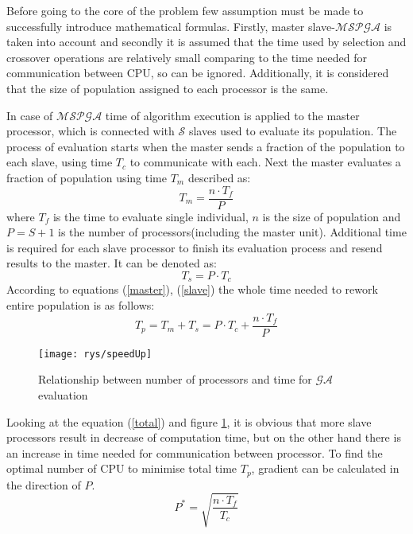 Before going to the core of the problem few assumption must be made to
successfully introduce mathematical formulas. Firstly, master
slave-$\mathcal{MSPGA}$ is taken into account and secondly it is assumed that the time used
by selection and crossover operations are relatively small comparing to the time
needed for communication between CPU, so can be ignored. Additionally, it is
considered that the size of population assigned to each processor is the same. 

In case of $\mathcal{MSPGA}$ time of algorithm execution is applied to the master
processor, which is connected with $\mathcal{S}$ slaves used to evaluate its population. The process of
evaluation starts when the master sends a fraction of the population to each
slave, using time $T_c$ to communicate with each. Next the master
evaluates a fraction of population using time $T_m$ described as:
\begin{equation}
	T_m=\frac{n\cdot T_f}{P}
	\label{master}
\end{equation}
where $T_f$ is the time to evaluate single individual, $n$ is the size of
population and $P=S+1$ is the number of processors(including the master unit). 
Additional time is required for each slave processor to finish its evaluation
process and resend results to the master. It can be denoted as:
\begin{equation}
	T_s=P\cdot T_c
	\label{slave}
\end{equation}
According to equations (\ref{master}), (\ref{slave}) the whole time needed to rework
entire population is as follows:
\begin{equation}
	T_p=T_m+T_s=P\cdot T_c+\frac{n\cdot T_f}{P}
	\label{total}
\end{equation}

\begin{figure}[!htb]
	\begin{center}
		\texttt{[image: rys/speedUp]}
	\end{center}
	\caption{Relationship between number of processors and time for
	$\mathcal{GA}$ evaluation}
	\label{fig:speedUp}
\end{figure}

Looking at the equation (\ref{total}) and figure \ref{fig:speedUp}, it is obvious that more slave processors
result in decrease of computation time, but on the other hand there is an
increase in time needed for communication between processor. To find the optimal
number of CPU to minimise total time $T_p$, gradient can be calculated in the
direction of $P$. 
\begin{equation}
	P^*=\sqrt{\frac{n\cdot T_f}{T_c}}
	\label{gradient}
\end{equation}

